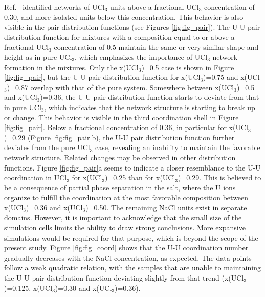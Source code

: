 \documentclass[preprint,3p,10pt,onecolumn,number,sort&compress]{elsarticle}
\begin{document}
Ref.~\cite{Li} identified networks of UCl$_3$ units above a fractional UCl$_3$ concentration of 0.30, and more isolated units below this concentration. This behavior is also visible in the pair distribution functions (see Figures \ref{fig:fig_pair}). The U-U pair distribution function for mixtures with a composition equal to or above a fractional UCl$_3$ concentration of 0.5 maintain the same or very similar shape and height as in pure UCl$_3$, which emphasizes the importance of UCl$_3$ network formation in the mixtures. Only the x(UCl$_3$)=0.5 case is shown in Figure \ref{fig:fig_pair}, but the U-U pair distribution function for x(UCl$_3$)=0.75 and x(UCl$_3$)=0.87 overlap with that of the pure system. Somewhere between x(UCl$_3$)=0.5 and x(UCl$_3$)=0.36, the U-U pair distribution function starts to deviate from that in pure UCl$_3$, which indicates that the network structure is starting to break up or change. This behavior is visible in the third coordination shell in Figure \ref{fig:fig_pair}. 
Below a fractional concentration of 0.36, in particular for x(UCl$_3$)=0.29 (Figure \ref{fig:fig_pair}b), the U-U pair distribution function further deviates from the pure UCl$_3$ case, revealing an inability to maintain the favorable network structure. 
Related changes may be observed in other distribution functions. Figure \ref{fig:fig_pair}a seems to indicate a closer resemblance to the U-U coordination in UCl$_3$ for x(UCl$_3$)=0.25 than for x(UCl$_3$)=0.29. This is believed to be a consequence of partial phase separation in the salt, where the U ions organize to fulfill the coordination at the most favorable composition between x(UCl$_3$)=0.36 and x(UCl$_3$)=0.50. The remaining NaCl units exist in separate domains. {\color{red}However, it is important to acknowledge that the small size of the simulation cells limits the ability to draw strong conclusions. More expansive simulations would be required for that purpose, which is beyond the scope of the present study.} 
Figure \ref{fig:fig_coord} shows that the U-U coordination number gradually decreases with the NaCl concentration, as expected. The data points follow a weak quadratic relation, with the samples that are unable to maintaining the U-U pair distribution function deviating slightly from that trend (x(UCl$_3$)=0.125, x(UCl$_3$)=0.30 and x(UCl$_3$)=0.36).
\end{document}
